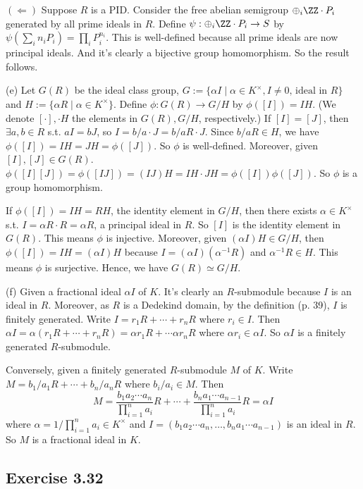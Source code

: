 \documentclass[../Chapter.tex]{subfiles}
\begin{document}
$(\Leftarrow)$ Suppose $R$ is a PID. Consider the free abelian semigroup $\oplus_{i} \ZZ\cdot P_i$ generated by all prime ideals in $R$. Define $\psi:\oplus_{i} \ZZ\cdot P_i \to S$ by $\psi(\sum_i n_iP_i)=\prod_i P_i^{n_i}$. This is well-defined because all prime ideals are now principal ideals. And it's clearly a bijective group homomorphism. So the result follows.

(e) Let $G(R)$ be the ideal class group, $G:=\{\alpha I\mid \alpha\in K^\times, I\neq 0\text{, ideal in } R\}$ and $H:=\{\alpha R\mid \alpha\in K^\times\}$. Define $\phi:G(R)\to G/H$ by $\phi([I])=IH$. (We denote $[\cdot],\cdot H$ the elements in $G(R),G/H$, respectively.) If $[I]=[J]$, then $\exists a,b\in R$ s.t. $aI=bJ$, so $I=b/a\cdot J=b/aR\cdot J$. Since $b/aR\in H$, we have $\phi([I])=IH=JH=\phi([J])$. So $\phi$ is well-defined. Moreover, given $[I],[J]\in G(R)$. $\phi([I][J])=\phi([IJ])=(IJ)H=IH\cdot JH=\phi([I])\phi([J])$. So $\phi$ is a group homomorphism.

If $\phi([I])=IH=RH$, the identity element in $G/H$, then there exists $\alpha\in K^\times$ s.t. $I=\alpha R\cdot R=\alpha R$, a principal ideal in $R$. So $[I]$ is the identity element in $G(R)$. This means $\phi$ is injective. Moreover, given $(\alpha I)H\in G/H$, then $\phi([I])=IH=(\alpha I)H$ because $I=(\alpha I)(\alpha^{-1}R)$ and $\alpha^{-1}R\in H$. This means $\phi$ is surjective. Hence, we have $G(R)\simeq G/H$.

(f) Given a fractional ideal $\alpha I$ of $K$. It's clearly an $R$-submodule because $I$ is an ideal in $R$. Moreover, as $R$ is a Dedekind domain, by the definition (p. 39), $I$ is finitely generated. Write $I=r_1R+\cdots+r_nR$ where $r_i\in I$. Then $\alpha I=\alpha(r_1R+\cdots+r_nR)=\alpha r_1R+\cdots\alpha r_nR$ where $\alpha r_i\in\alpha I$. So $\alpha I$ is a finitely generated $R$-submodule. 

Conversely, given a finitely generated $R$-submodule $M$ of $K$. Write $M=b_1/a_1R+\cdots+b_n/a_nR$ where $b_i/a_i\in M$. Then $$M=\frac{b_1a_2\cdots a_n}{\prod_{i=1}^n a_i}R+\cdots+\frac{b_na_1\cdots a_{n-1}}{\prod_{i=1}^n a_i}R=\alpha I$$ where $\alpha=1/\prod_{i=1}^n a_i\in K^\times$ and $I=(b_1a_2\cdots a_n,\ldots,b_na_1\cdots a_{n-1})$ is an ideal in $R$. So $M$ is a fractional ideal in $K$.

\subsection*{Exercise 3.32}
\end{document}
